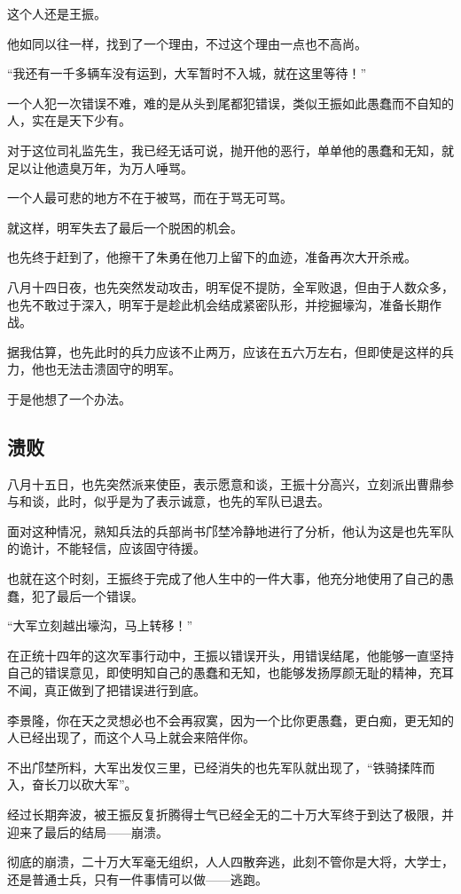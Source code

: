 \begin{multicols}{\theparacolNo}
这个人还是王振。

他如同以往一样，找到了一个理由，不过这个理由一点也不高尚。

“我还有一千多辆车没有运到，大军暂时不入城，就在这里等待！”

一个人犯一次错误不难，难的是从头到尾都犯错误，类似王振如此愚蠢而不自知的人，实在是天下少有。

对于这位司礼监先生，我已经无话可说，抛开他的恶行，单单他的愚蠢和无知，就足以让他遗臭万年，为万人唾骂。

一个人最可悲的地方不在于被骂，而在于骂无可骂。

就这样，明军失去了最后一个脱困的机会。

也先终于赶到了，他擦干了朱勇在他刀上留下的血迹，准备再次大开杀戒。

八月十四日夜，也先突然发动攻击，明军促不提防，全军败退，但由于人数众多，也先不敢过于深入，明军于是趁此机会结成紧密队形，并挖掘壕沟，准备长期作战。

据我估算，也先此时的兵力应该不止两万，应该在五六万左右，但即使是这样的兵力，他也无法击溃固守的明军。

于是他想了一个办法。

\subsection{溃败}
八月十五日，也先突然派来使臣，表示愿意和谈，王振十分高兴，立刻派出曹鼎参与和谈，此时，似乎是为了表示诚意，也先的军队已退去。

面对这种情况，熟知兵法的兵部尚书邝埜冷静地进行了分析，他认为这是也先军队的诡计，不能轻信，应该固守待援。

也就在这个时刻，王振终于完成了他人生中的一件大事，他充分地使用了自己的愚蠢，犯了最后一个错误。

“大军立刻越出壕沟，马上转移！”

在正统十四年的这次军事行动中，王振以错误开头，用错误结尾，他能够一直坚持自己的错误意见，即使明知自己的愚蠢和无知，也能够发扬厚颜无耻的精神，充耳不闻，真正做到了把错误进行到底。

李景隆，你在天之灵想必也不会再寂寞，因为一个比你更愚蠢，更白痴，更无知的人已经出现了，而这个人马上就会来陪伴你。

不出邝埜所料，大军出发仅三里，已经消失的也先军队就出现了，“铁骑揉阵而入，奋长刀以砍大军”。

经过长期奔波，被王振反复折腾得士气已经全无的二十万大军终于到达了极限，并迎来了最后的结局——崩溃。

彻底的崩溃，二十万大军毫无组织，人人四散奔逃，此刻不管你是大将，大学士，还是普通士兵，只有一件事情可以做——逃跑。


\end{multicols}
